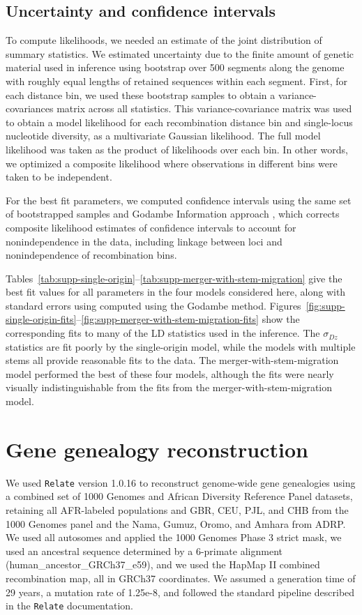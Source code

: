 \documentclass[]{article}
\newcommand{\Relate}{\texttt{Relate}\xspace}
\begin{document}
\subsection{Uncertainty and confidence intervals}

To compute likelihoods, we needed an estimate of the joint
distribution of summary statistics. 
We estimated uncertainty due to the finite amount of genetic material
used in inference using bootstrap over 500 segments along the genome with
roughly equal lengths of retained sequences within each segment. First, for
each distance bin, we used these bootstrap samples to obtain a
variance-covariances matrix across all statistics. This variance-covariance
matrix was used to obtain a model likelihood for each recombination distance
bin and single-locus nucleotide diversity, as a multivariate Gaussian
likelihood. The full model likelihood was taken as the product of likelihoods
over each bin. In other words, we optimized a composite likelihood where
observations in different bins were taken to be independent. 

For the best fit parameters, we computed confidence intervals using the 
same set of bootstrapped samples and Godambe Information
approach \citep{Coffman2016-yq}, which corrects composite likelihood estimates of confidence intervals
to account for nonindependence in the data, including linkage between loci and
nonindependence of recombination bins.

Tables~\ref{tab:supp-single-origin}--\ref{tab:supp-merger-with-stem-migration}
give the best fit values for all parameters in the four models considered here,
along with standard errors using computed using the Godambe method.
Figures~\ref{fig:supp-single-origin-fits}--\ref{fig:supp-merger-with-stem-migration-fits}
show the corresponding fits to many of the LD statistics used in the inference.
The $\sigma_{Dz}$ statistics are fit poorly by the single-origin model, while
the models with multiple stems all provide reasonable fits to the data. The
merger-with-stem-migration model performed the best of these four models,
although the fits were nearly visually indistinguishable from the fits from the
merger-with-stem-migration model.

\section{Gene genealogy reconstruction}
\label{sec:relate}

We used \Relate version 1.0.16 \citep{Speidel2019-nj} to reconstruct genome-wide
gene genealogies using a combined set of 1000 Genomes and African Diversity
Reference Panel datasets, retaining all AFR-labeled populations and GBR, CEU,
PJL, and CHB from the 1000 Genomes panel and the Nama, Gumuz, Oromo, and Amhara
from ADRP. We used all autosomes and applied the 1000 Genomes Phase 3 strict
mask, we used an ancestral sequence determined by a 6-primate alignment
(human\_ancestor\_GRCh37\_e59), and we used the HapMap II combined
recombination map, all in GRCh37 coordinates. We assumed a generation time of
29 years, a mutation rate of 1.25e-8, and followed the standard pipeline
described in the \Relate documentation.
\end{document}
